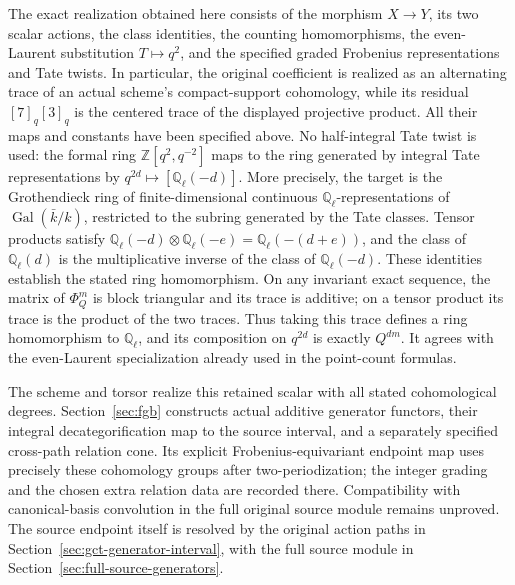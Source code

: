 The exact realization obtained here consists of the morphism
$X\to Y$, its two scalar actions, the class identities, the counting
homomorphisms, the even-Laurent substitution $T\mapsto q^2$, and the
specified graded Frobenius representations and Tate twists. In particular,
the original coefficient is realized as an alternating trace of an actual
scheme's compact-support cohomology, while its residual $[7]_q[3]_q$
is the centered trace of the displayed projective product. All their
maps and constants have been specified above. No half-integral Tate
twist is used: the formal ring $\mathbb Z[q^2,q^{-2}]$ maps to the
ring generated by integral Tate representations by
$q^{2d}\mapsto[\mathbb Q_\ell(-d)]$.
More precisely, the target is the Grothendieck ring of finite-dimensional
continuous $\mathbb Q_\ell$-representations of
$\operatorname{Gal}(\bar k/k)$, restricted to the subring generated by
the Tate classes. Tensor products satisfy
$\mathbb Q_\ell(-d)\otimes\mathbb Q_\ell(-e)
=\mathbb Q_\ell(-(d+e))$, and the class of
$\mathbb Q_\ell(d)$ is the multiplicative inverse of the class of
$\mathbb Q_\ell(-d)$. These identities establish the stated ring
homomorphism. On any invariant exact sequence, the matrix of
$\Phi_Q^m$ is block triangular and its trace is additive; on a tensor
product its trace is the product of the two traces. Thus taking this
trace defines a ring homomorphism to $\mathbb Q_\ell$, and its
composition on $q^{2d}$ is exactly $Q^{dm}$. It agrees with the
even-Laurent specialization already used in the point-count formulas.

The scheme and torsor realize this retained scalar with all stated
cohomological degrees. Section~\ref{sec:fgb} constructs actual
additive generator functors, their integral decategorification map
to the source interval, and a separately specified cross-path relation
cone. Its explicit Frobenius-equivariant endpoint map uses precisely
these cohomology groups after two-periodization; the integer grading
and the chosen extra relation data are recorded there. Compatibility
with canonical-basis convolution in the full original source module
remains unproved. The source endpoint itself is resolved by the
original action paths in Section~\ref{sec:gct-generator-interval},
with the full source module in Section~\ref{sec:full-source-generators}.
